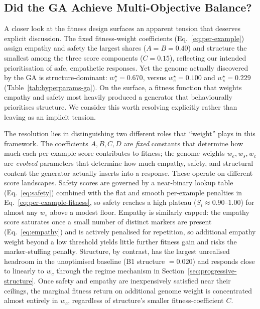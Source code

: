 \documentclass[mathematics,article,xetex,moreauthors]{Definitions/mdpi}
\begin{document}
\subsection{Did the GA Achieve Multi-Objective Balance?}
\label{sec:balance-discussion}

A closer look at the fitness design surfaces an apparent tension that
deserves explicit discussion. The fixed fitness-weight coefficients
(Eq.~\eqref{eq:per-example}) assign empathy and safety the largest shares
($A=B=0.40$) and structure the smallest among the three score components
($C=0.15$), reflecting our intended prioritisation of safe, empathetic
responses. Yet the genome actually discovered by the GA is structure-dominant:
$w_c^{\star}=0.670$, versus $w_e^{\star}=0.100$ and $w_s^{\star}=0.229$
(Table~\ref{tab:hyperparams-ga}). On the surface, a fitness function that weights
empathy and safety most heavily produced a generator that behaviourally
prioritises structure. We consider this worth resolving explicitly rather
than leaving as an implicit tension.

The resolution lies in distinguishing two different roles that ``weight''
plays in this framework. The coefficients $A,B,C,D$ are \emph{fixed}
constants that determine how much each per-example score contributes to
fitness; the genome weights $w_e,w_s,w_c$ are \emph{evolved} parameters that
determine how much empathy, safety, and structural content the generator
actually inserts into a response. These operate on different score
landscapes. Safety scores are governed by a near-binary lookup table
(Eq.~\eqref{eq:safety}) combined with the flat and smooth per-example
penalties in Eq.~\eqref{eq:per-example-fitness}, so safety reaches a high
plateau ($S_i \approx 0.90$--$1.00$) for almost any $w_s$ above a modest
floor. Empathy is similarly capped: the empathy score saturates once a small
number of distinct markers are present (Eq.~\eqref{eq:empathy}) and is
actively penalised for repetition, so additional empathy weight beyond a low
threshold yields little further fitness gain and risks the marker-stuffing
penalty. Structure, by contrast, has the largest unrealised headroom in the
unoptimised baseline (B1 structure $= 0.020$) and responds close to linearly
to $w_c$ through the regime mechanism in Section~\ref{sec:progressive-structure}.
Once safety and empathy are inexpensively satisfied near their ceilings, the
marginal fitness return on additional genome weight is concentrated almost
entirely in $w_c$, regardless of structure's smaller fitness-coefficient
$C$.
\end{document}

